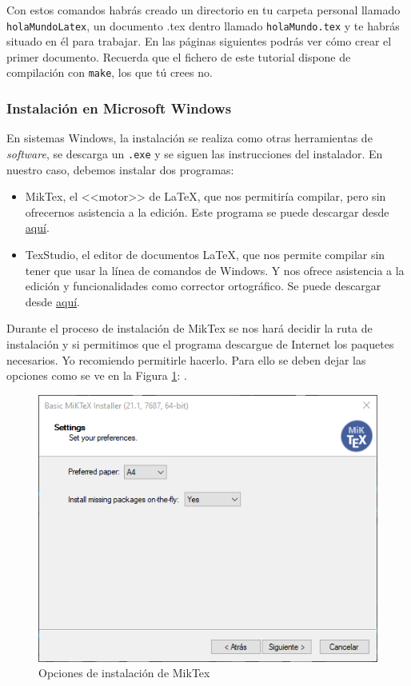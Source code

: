 \documentclass[a4paper]{article}
\begin{document}
Con estos comandos habrás creado un directorio en tu carpeta personal llamado
\texttt{holaMundoLatex}, un documento .tex dentro llamado \texttt{holaMundo.tex}
y te habrás situado en él para trabajar. En las páginas siguientes podrás ver
cómo crear el primer documento. Recuerda que el fichero de este tutorial dispone
de compilación con \texttt{make}, los que tú crees no.

\subsubsection{Instalación en Microsoft Windows}
En sistemas Windows, la instalación se realiza como otras herramientas de
\textit{software}, se descarga un \texttt{.exe} y se siguen las instrucciones
del instalador. En nuestro caso, debemos instalar dos programas:
\begin{itemize}
    \item MikTex, el <<motor>> de \LaTeX{}, que nos permitiría compilar,
pero sin ofrecernos asistencia a la edición.
Este programa se puede descargar desde \href{https://miktex.org/download}{aquí}. 
    \item TexStudio, el editor de documentos \LaTeX{}, que nos permite compilar
sin tener que usar la línea de comandos de Windows. Y nos ofrece
asistencia a la edición y funcionalidades como corrector ortográfico.
Se puede descargar desde \href{https://www.texstudio.org/}{aquí}.
\end{itemize}

Durante el proceso de
instalación de MikTex se nos hará decidir la ruta de instalación y si permitimos
que el programa descargue de Internet los paquetes necesarios. Yo
recomiendo permitirle hacerlo. Para ello se deben dejar las opciones como
se ve en la Figura \ref{fig:miktex}: .
\begin{figure}[H]
    \center
    \includegraphics[width=0.75\hsize]{miktexInstall}
    \caption{Opciones de instalación de MikTex}
    \label{fig:miktex}
\end{figure}
\end{document}

